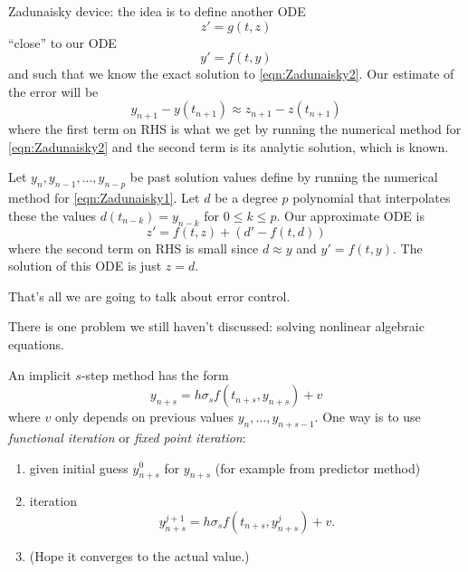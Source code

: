 \documentclass[a4paper]{article}
\begin{document}
Zadunaisky device: the idea is to define another ODE
\begin{equation}
  \label{eqn:Zadunaisky2}
  z' = g(t, z)
  \tag{\(\ast\)}
\end{equation}
``close'' to our ODE
\begin{equation}
  \label{eqn:Zadunaisky1}
  y' = f(t, y)
  \tag{\(\ast\ast\)}
\end{equation}
and such that we know the exact solution to \eqref{eqn:Zadunaisky2}. Our estimate of the error will be
\[
  y_{n + 1} - y(t_{n + 1}) \approx z_{n + 1} - z(t_{n + 1})
\]
where the first term on RHS is what we get by running the numerical method for \eqref{eqn:Zadunaisky2} and the second term is its analytic solution, which is known.

Let \(y_n, y_{n - 1}, \dots, y_{n - p}\) be past solution values define by running the numerical method for \eqref{eqn:Zadunaisky1}. Let \(d\) be a degree \(p\) polynomial that interpolates these the values \(d(t_{n - k}) = y_{n - k}\) for \(0 \leq k \leq p\). Our approximate ODE is
\[
  z' = f(t, z) + (d' - f(t, d))
\]
where the second term on RHS is small since \(d \approx y\) and \(y' = f(t, y)\). The solution of this ODE is just \(z = d\).

That's all we are going to talk about error control.

There is one problem we still haven't discussed: solving nonlinear algebraic equations.

An implicit \(s\)-step method has the form
\[
  y_{n + s} = h \sigma_s f(t_{n + s}, y_{n + s}) + v
\]
where \(v\) only depends on previous values \(y_n, \dots, y_{n + s - 1}\). One way is to use \emph{functional iteration} or \emph{fixed point iteration}:
\begin{enumerate}
\item given initial guess \(y_{n + s}^0\) for \(y_{n + s}\) (for example from predictor method)
\item iteration
  \[
    y_{n + s}^{j + 1} = h \sigma_s f(t_{n + s}, y_{n + s}^j) + v.
  \]
\item (Hope it converges to the actual value.)
\end{enumerate}













\printindex

\iffalse
http://damtp.cam.ac.uk/user/hf323/L18-IB-NA/
\fi
\end{document}
